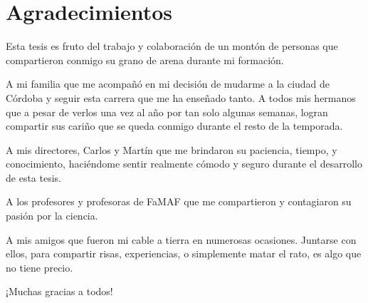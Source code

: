\chapter*{\center \Large  Agradecimientos}
Esta tesis es fruto del trabajo y colaboración de un montón de personas que
compartieron conmigo su grano de arena durante mi formación.

A mi familia que me acompañó en mi decisión de mudarme a la ciudad de Córdoba y
seguir esta carrera que me ha enseñado tanto. A todos mis hermanos que a pesar
de verlos una vez al año por tan solo algunas semanas, logran compartir sus
cariño que se queda conmigo durante el resto de la temporada.

A mis directores, Carlos y Martín que me brindaron su paciencia, tiempo, y
conocimiento, haciéndome sentir realmente cómodo y seguro durante el desarrollo
de esta tesis. 

A los profesores y profesoras de FaMAF que me compartieron y contagiaron su
pasión por la ciencia.

A mis amigos que fueron mi cable a tierra en numerosas ocasiones. Juntarse con
ellos, para compartir risas, experiencias, o simplemente matar el rato, es algo
que no tiene precio.

¡Muchas gracias a todos!